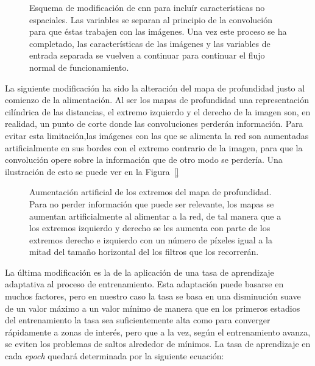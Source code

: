 \begin{figure}
	\centering
	\caption[Esquema de modificación de \ac{cnn} para incluír características no espaciales]{Esquema de modificación de \ac{cnn} para incluír características no espaciales. Las variables se separan al principio de la convolución para que éstas trabajen con las imágenes. Una vez este proceso se ha completado, las características de las imágenes y las variables de entrada separada se vuelven a continuar para continuar el flujo normal de funcionamiento.}
	\label{fig:modification-of-cnn-to-work-with-variables}
\end{figure}

La siguiente modificación ha sido la alteración del mapa de profundidad justo al comienzo de la alimentación. Al ser los mapas de profundidad una representación cilíndrica de las distancias, el extremo izquierdo y el derecho de la imagen son, en realidad, un punto de corte donde las convoluciones perderán información. Para evitar esta limitación,las imágenes con las que se alimenta la red son aumentadas artificialmente en sus bordes con el extremo contrario de la imagen, para que la convolución opere sobre la información que de otro modo se perdería. Una ilustración de esto se puede ver en la Figura~\ref{}

\begin{figure}
	\centering
	\caption[Aumentación artificial de los extremos del mapa de profundidad]{Aumentación artificial de los extremos del mapa de profundidad. Para no perder información que puede ser relevante, los mapas se aumentan artificialmente al alimentar a la red, de tal manera que a los extremos izquierdo y derecho se les aumenta con parte de los extremos derecho e izquierdo con un número de píxeles igual a la mitad del tamaño horizontal del los filtros que los recorrerán.}
	\label{fig:deepmap-augmentation-in-cnn}
\end{figure}

La última modificación es la de la aplicación de una tasa de aprendizaje adaptativa al proceso de entrenamiento. Esta adaptación puede basarse en muchos factores, pero en nuestro caso la tasa se basa en una disminución suave de un valor máximo a un valor mínimo de manera que en los primeros estadios del entrenamiento la tasa sea suficientemente alta como para converger rápidamente a zonas de interés, pero que a la vez, según el entrenamiento avanza, se eviten los problemas de saltos alrededor de mínimos. La tasa de aprendizaje en cada \textit{epoch} quedará determinada por la siguiente ecuación:

